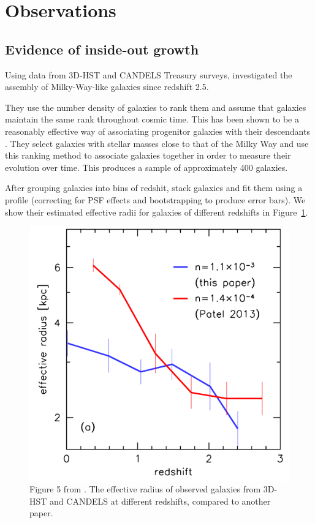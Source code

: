 \documentclass[preprint2]{aastex631}
\begin{document}
\section{Observations}
\subsection{Evidence of inside-out growth}
Using data from 3D-HST and CANDELS Treasury surveys, \citet{vanDokkum+2013} investigated the assembly of Milky-Way-like galaxies since redshift 2.5.

They use the number density of galaxies to rank them and assume that galaxies maintain the same rank throughout cosmic time. This has been shown to be a reasonably effective way of associating progenitor galaxies with their descendants \citep{Leja+2013}. They select galaxies with stellar masses close to that of the Milky Way and use this ranking method to associate galaxies together in order to measure their evolution over time. This produces a sample of approximately 400 galaxies.

After grouping galaxies into bins of redshit, \citet{vanDokkum+2013} stack galaxies and fit them using a \citet{Sersic+1968} profile (correcting for PSF effects and bootstrapping to produce error bars). We show their estimated effective radii for galaxies of different redshifts in Figure~\ref{fig:vd}.

\begin{figure}[htb]
    \centering
    \includegraphics[width=\columnwidth]{vandokkum2013_fig5.png}
    \caption{Figure 5 from \citet{vanDokkum+2013}. The effective radius of observed galaxies from 3D-HST and CANDELS at different redshifts, compared to another paper.}
    \label{fig:vd}
\end{figure}
\end{document}
